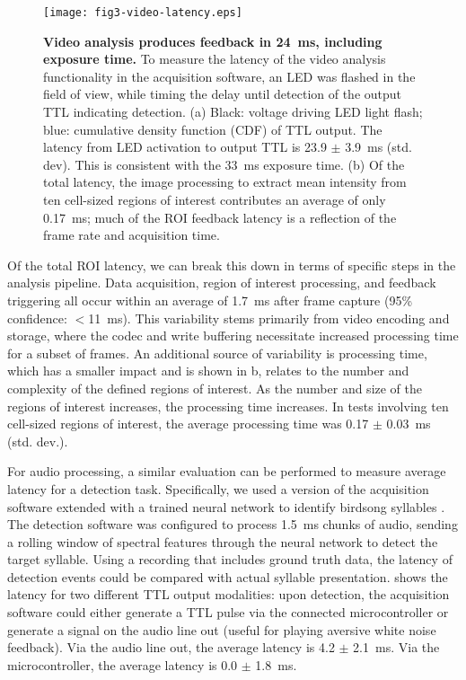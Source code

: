 \begin{figure}
\texttt{[image: fig3-video-latency.eps]}
\caption[Latency for video processing]{\textbf{Video analysis 
produces feedback in 24~ms, including exposure time.} To measure 
the latency of the video analysis functionality in the 
acquisition software, an LED was flashed in the field of view,
while timing the delay until detection of the output TTL indicating detection. 
(a) Black: voltage driving LED light flash; blue: cumulative density 
function (CDF) of TTL output. The latency from LED activation to 
output TTL is 23.9 $\pm$ 3.9~ms (std. dev). This is consistent
with the 33~ms exposure time. (b) Of the total latency, the image 
processing to extract mean intensity from ten cell-sized regions 
of interest contributes an average of only 0.17~ms; much of the 
ROI feedback latency is a reflection of the frame rate and 
acquisition time.}
\label{fig:video-latency}
\end{figure}

Of the total ROI latency, we can break this down in terms of 
specific steps in the analysis pipeline. Data acquisition, 
region of interest processing, and feedback triggering all 
occur within an average of 1.7~ms after frame 
capture (95\% confidence: $<$11~ms). This variability stems primarily 
from video encoding and storage, where the codec and write buffering 
necessitate increased processing time for a subset of frames. An 
additional  source of variability is processing time, which has a 
smaller impact and is shown in b, relates 
to the number and 
complexity of the defined regions of interest. As the number and size 
of the regions of interest increases, the processing time increases. 
In tests involving ten cell-sized regions of interest, the average 
processing time was 0.17 $\pm$ 0.03~ms (std. dev.).

For audio processing, a similar evaluation can be performed to 
measure average latency for a detection task. Specifically, we 
used a version of the acquisition software extended with a 
trained neural network to identify birdsong syllables 
\cite{Pearre:2017cs}. The detection software was configured to 
process 1.5~ms chunks of audio, sending a rolling window of 
spectral features through the neural network to detect the 
target syllable. Using a recording that includes ground 
truth data, the latency of detection events could be compared 
with actual syllable presentation.  
shows the latency for two different TTL output modalities: 
upon detection, the acquisition software could either 
generate a TTL pulse via the connected microcontroller or 
generate a signal on the audio line out (useful for playing 
aversive white noise feedback). Via the audio line out, the 
average latency is 4.2 $\pm$ 2.1~ms. Via the microcontroller,
the average latency is 0.0 $\pm$ 1.8~ms. 

